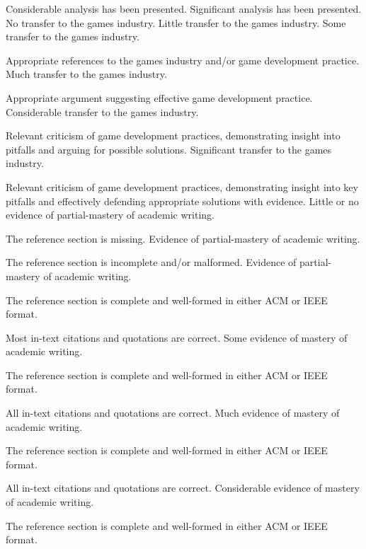 \documentclass{../fal_assignment}
\begin{document}
\begin{markingrubric}
        \grade 		Considerable analysis has been presented.
        \grade 		Significant analysis has been presented.
%
        \grade\fail 	No transfer to the games industry.
        \grade 		Little transfer to the games industry.
        \grade 		Some transfer to the games industry. 
        \par 		Appropriate references to the games industry and/or game development practice. 
        \grade 		Much transfer to the games industry.
        \par 		Appropriate argument suggesting effective game development practice. 
        \grade 		Considerable transfer to the games industry.
        \par 		Relevant criticism of game development practices, demonstrating insight into pitfalls and arguing for possible solutions. 
        \grade 		Significant transfer to the games industry.
        \par 		Relevant criticism of game development practices, demonstrating insight into key pitfalls and effectively defending appropriate solutions with evidence. 
%
        \grade\fail 	Little or no evidence of partial-mastery of academic writing.
        \par 		The reference section is missing.
        \grade 		Evidence of partial-mastery of academic writing.
        \par 		The reference section is incomplete and/or malformed.
        \grade 		Evidence of partial-mastery of academic writing.
        \par 		The reference section is complete and well-formed in either ACM or IEEE format.
        \par 		Most in-text citations and quotations are correct.
        \grade 		Some evidence of mastery of academic writing.
        \par 		The reference section is complete and well-formed in either ACM or IEEE format.
        \par 		All in-text citations and quotations are correct.
        \grade 		Much evidence of mastery of academic writing.
        \par 		The reference section is complete and well-formed in either ACM or IEEE format.
        \par 		All in-text citations and quotations are correct.
        \grade 		Considerable evidence of mastery of academic writing.
        \par 		The reference section is complete and well-formed in either ACM or IEEE format.

\end{markingrubric}
\end{document}
